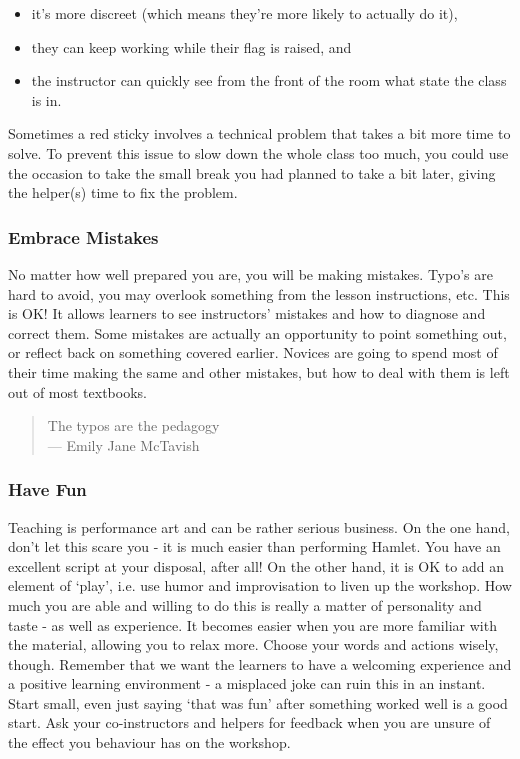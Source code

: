 \begin{itemize}
\itemsep1pt\parskip0pt
\item
  it's more discreet (which means they're more likely to actually do
  it),
\item
  they can keep working while their flag is raised, and
\item
  the instructor can quickly see from the front of the room what state
  the class is in.
\end{itemize}

Sometimes a red sticky involves a technical problem that takes a bit
more time to solve. To prevent this issue to slow down the whole class
too much, you could use the occasion to take the small break you had
planned to take a bit later, giving the helper(s) time to fix the
problem.

\subsubsection{Embrace Mistakes}\label{embrace-mistakes}

No matter how well prepared you are, you will be making mistakes. Typo's
are hard to avoid, you may overlook something from the lesson
instructions, etc. This is OK! It allows learners to see instructors'
mistakes and how to diagnose and correct them. Some mistakes are
actually an opportunity to point something out, or reflect back on
something covered earlier. Novices are going to spend most of their time
making the same and other mistakes, but how to deal with them is left
out of most textbooks.

\begin{quote}
The typos are the pedagogy\\--- Emily Jane McTavish
\end{quote}

\subsubsection{Have Fun}\label{have-fun}

Teaching is performance art and can be rather serious business. On the
one hand, don't let this scare you - it is much easier than performing
Hamlet. You have an excellent script at your disposal, after all! On the
other hand, it is OK to add an element of `play', i.e. use humor and
improvisation to liven up the workshop. How much you are able and
willing to do this is really a matter of personality and taste - as well
as experience. It becomes easier when you are more familiar with the
material, allowing you to relax more. Choose your words and actions
wisely, though. Remember that we want the learners to have a welcoming
experience and a positive learning environment - a misplaced joke can
ruin this in an instant. Start small, even just saying `that was fun'
after something worked well is a good start. Ask your co-instructors and
helpers for feedback when you are unsure of the effect you behaviour has
on the workshop.

